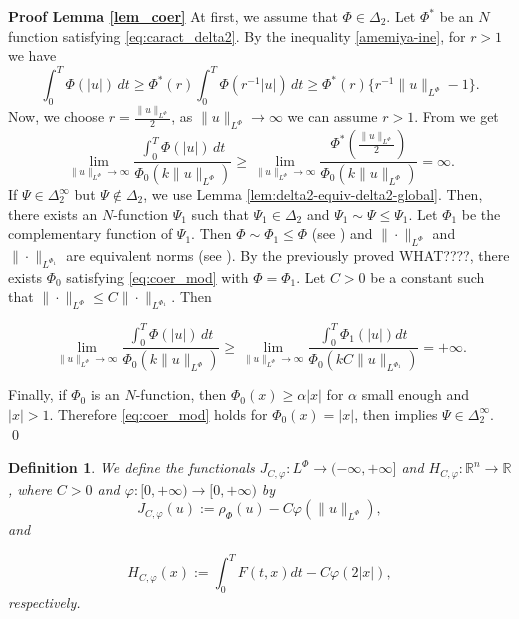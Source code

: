 \documentclass[twoside]{article}
\newtheorem{defi}[thm]{Definition}
\theoremstyle{remark}
\newcommand{\orlnor}{\|_{L^{\Phi}}}
\newcommand{\lphi}{L^{\Phi}}
\newcommand{\rr}{\mathbb{R}}
\renewcommand{\leq}{\leqslant}
\renewcommand{\geq}{\geqslant}
\begin{document}
\noindent\textbf{Proof Lemma \ref{lem_coer}} At first, we assume that $\Phi \in \Delta_2$. 
Let $\Phi^*$ be an $N$ function satisfying \eqref{eq:caract_delta2}. By the inequality \eqref{amemiya-ine}, for $r>1$ we have
\[
\int_0^T \Phi(|u|)\,dt\geq
\Phi^*(r) \int_0^T \Phi(r^{-1}|u|)\,dt\geq
\Phi^*(r)\{r^{-1}\|u\orlnor-1\}.
\]
Now, we choose $r=\frac{\|u\orlnor}{2}$, as $\|u\orlnor\to\infty$ we can assume $r>1$. From \cite[Thm. 2 (b)(v), p. 16]{rao1991theory} we get
\[
\lim\limits_{\|u\orlnor \to \infty} \frac{\int_0^T \Phi(|u|)\,dt}{\Phi_0(k\|u\orlnor)}\geq
\lim\limits_{\|u\orlnor \to \infty} \frac{\Phi^*\left(\frac{\|u\orlnor}{2}\right)}{\Phi_0(k\|u\orlnor)}
=\infty.
\]
 If $\Psi\in\Delta_2^{\infty}$ but $\Psi\notin\Delta_2$, we  use Lemma \ref{lem:delta2-equiv-delta2-global}. 
Then, there exists an $N$-function $\Psi_1$ such that $\Psi_1\in\Delta_2$ and  $\Psi_1\sim\Psi\leq \Psi_1$. 
Let $\Phi_1$ be the complementary function of $\Psi_1$. Then $\Phi\sim\Phi_1\leq \Phi$ (see \cite[Thm. 3.1]{KR}) and $\|\cdot\orlnor$ and $\|\cdot\|_{L^{\Phi_1}}$ are equivalent norms  (see \cite[Thm. 13.2 and Thm. 13.3]{KR}). 
By the previously proved WHAT????, there exists $\Phi_0$ satisfying  \eqref{eq:coer_mod} with $\Phi=\Phi_1$. 
Let $C>0$ be a constant such that  $\|\cdot\orlnor\leq C\|\cdot\|_{L^{\Phi_1}}$. Then

\[\lim\limits_{\|u\orlnor \to \infty}\frac{\int_0^T \Phi(|u|)\,dt}{\Phi_0(k\|u\orlnor)}\geq \lim\limits_{\|u\orlnor \to \infty} \frac{\int_0^T \Phi_1(|u|)dt}{\Phi_0(kC\|u\|_{L^{\Phi_1}})}=+\infty.\]


Finally, if $\Phi_0$ is an $N$-function, then $\Phi_0(x)\geq \alpha |x|$ for  $\alpha$ small enough and $|x|>1$.
Therefore \eqref{eq:coer_mod} holds for $\Phi_0(x)=|x|$, then \cite[Lemma 5.2]{ABGMS2015}  
implies  $\Psi\in\Delta_2^{\infty}$. \qed









\begin{defi}We define the  functionals $J_{C,\varphi}:\lphi\to (-\infty,+\infty]$ and $  H_{C,\varphi}:\rr^n\to \rr$, where $C>0$ and $\varphi:[0,+\infty)\to [0,+\infty)$ by
\begin{equation}\label{func_phi}
  J_{C,\varphi}(u):= \rho_{\Phi}\left(u\right)-C\varphi\left(\|u\orlnor\right),
\end{equation}
 and

\begin{equation}\label{eq:functional_H-bis}
 H_{C,\varphi}(x):=\int_0^TF(t,x)dt-C\varphi(2|x|),
\end{equation}
respectively.
\end{defi}
\end{document}
